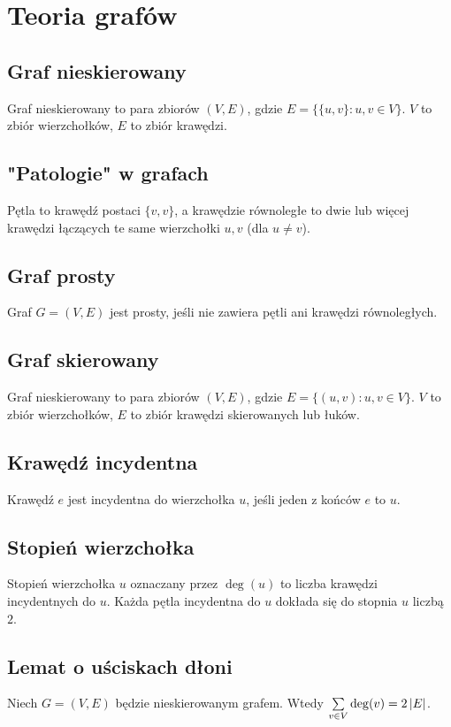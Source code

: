 \section{Teoria grafów}

\subsection*{Graf nieskierowany}
Graf nieskierowany to para zbiorów $(V, E)$, gdzie $E = \{ \{u, v\} : u, v \in V \}$.
$V$ to zbiór wierzchołków, $E$ to zbiór krawędzi.

\subsection*{"Patologie" w grafach}
Pętla to krawędź postaci $\{ v, v\}$, a krawędzie równoległe to dwie lub więcej
krawędzi łączących te same wierzchołki $u,v$ (dla $u \neq v$).

\subsection*{Graf prosty}
Graf $G = (V, E)$ jest prosty, jeśli nie zawiera pętli ani krawędzi równoległych.

\subsection*{Graf skierowany}
Graf nieskierowany to para zbiorów $(V, E)$, gdzie $E = \{ (u, v) : u, v \in V \}$.
$V$ to zbiór wierzchołków, $E$ to zbiór krawędzi skierowanych lub łuków.

\subsection*{Krawędź incydentna}
Krawędź $e$ jest incydentna do wierzchołka $u$, jeśli jeden z końców $e$ to $u$.

\subsection*{Stopień wierzchołka}
Stopień wierzchołka $u$ oznaczany przez $\deg(u)$ to liczba krawędzi incydentnych
do $u$. Każda pętla incydentna do $u$ dokłada się do stopnia $u$ liczbą $2$.

\subsection*{Lemat o uściskach dłoni}
Niech $G = (V, E)$ będzie nieskierowanym grafem. Wtedy
$\sum\limits_{v \in V} \deg(v) = 2 \left| E \right|$.

